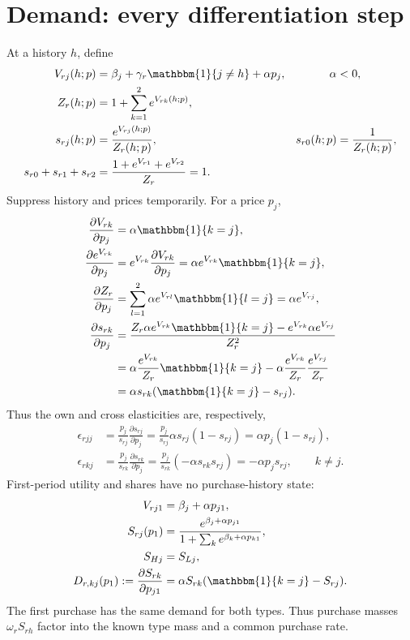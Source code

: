 \documentclass[12pt]{article}
\theoremstyle{definition}
\theoremstyle{remark}
\newcommand{\ind}{\mathbbm{1}}
\numberwithin{equation}{section}
\begin{document}
\section{Demand: every differentiation step}
At a history $h$, define
\begin{align}
 V_{rj}(h;p)&=\beta_j+\gamma_r\ind\{j\ne h\}+\alpha p_j,
 &\alpha&<0,\\
 Z_r(h;p)&=1+\sum_{k=1}^2 e^{V_{rk}(h;p)},\\
 s_{rj}(h;p)&=\frac{e^{V_{rj}(h;p)}}{Z_r(h;p)},
 &s_{r0}(h;p)&=\frac1{Z_r(h;p)},\\
 s_{r0}+s_{r1}+s_{r2}
 &=\frac{1+e^{V_{r1}}+e^{V_{r2}}}{Z_r}=1.
\end{align}
Suppress history and prices temporarily. For a price $p_j$,
\begin{align}
 \frac{\partial V_{rk}}{\partial p_j}&=\alpha\ind\{k=j\},\\
 \frac{\partial e^{V_{rk}}}{\partial p_j}
 &=e^{V_{rk}}\frac{\partial V_{rk}}{\partial p_j}
 =\alpha e^{V_{rk}}\ind\{k=j\},\\
 \frac{\partial Z_r}{\partial p_j}
 &=\sum_{l=1}^2\alpha e^{V_{rl}}\ind\{l=j\}
 =\alpha e^{V_{rj}},\\
 \frac{\partial s_{rk}}{\partial p_j}
 &=\frac{Z_r\alpha e^{V_{rk}}\ind\{k=j\}
               -e^{V_{rk}}\alpha e^{V_{rj}}}{Z_r^2}\\
 &=\alpha\frac{e^{V_{rk}}}{Z_r}\ind\{k=j\}
       -\alpha\frac{e^{V_{rk}}}{Z_r}\frac{e^{V_{rj}}}{Z_r}\\
 &=\alpha s_{rk}(\ind\{k=j\}-s_{rj}).
\end{align}
Thus the own and cross elasticities are, respectively,
\begin{align}
 \epsilon_{rjj}
 &=\frac{p_j}{s_{rj}}\frac{\partial s_{rj}}{\partial p_j}
 =\frac{p_j}{s_{rj}}\alpha s_{rj}(1-s_{rj})
 =\alpha p_j(1-s_{rj}),\\
 \epsilon_{rkj}
 &=\frac{p_j}{s_{rk}}\frac{\partial s_{rk}}{\partial p_j}
 =\frac{p_j}{s_{rk}}(-\alpha s_{rk}s_{rj})
 =-\alpha p_js_{rj},\qquad k\ne j.
\end{align}
First-period utility and shares have no purchase-history state:
\begin{align}
 V_{rj1}&=\beta_j+\alpha p_{j1},\\
 S_{rj}(p_1)&=\frac{e^{\beta_j+\alpha p_{j1}}}
 {1+\sum_k e^{\beta_k+\alpha p_{k1}}},\\
 S_{Hj}&=S_{Lj},\\
 D_{r,kj}(p_1):=\frac{\partial S_{rk}}{\partial p_{j1}}
 &=\alpha S_{rk}(\ind\{k=j\}-S_{rj}).
\end{align}
The first purchase has the same demand for both types. Thus purchase masses
$\omega_r S_{rh}$ factor into the known type mass and a common purchase rate.
\end{document}
